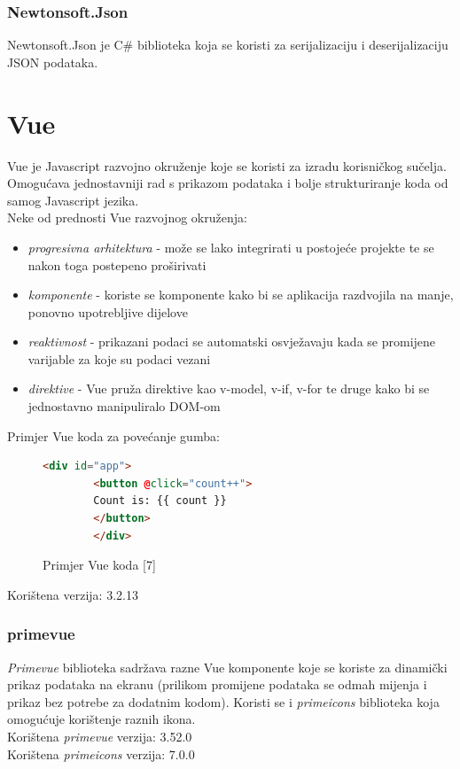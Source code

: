 \documentclass[zavrsnirad]{fer}
\begin{document}
\subsubsection{Newtonsoft.Json}
Newtonsoft.Json je C\# biblioteka koja se koristi za serijalizaciju i deserijalizaciju JSON podataka.

\section{Vue}
\label{pog:vue}
Vue je Javascript razvojno okruženje koje se koristi za izradu korisničkog sučelja. Omogućava jednostavniji rad s prikazom podataka i bolje strukturiranje koda od samog Javascript jezika.
\\Neke od prednosti Vue razvojnog okruženja:
\begin{itemize}
	\item \textit{progresivna arhitektura} - može se lako integrirati u postojeće projekte te se nakon toga postepeno proširivati
	\item \textit{komponente} - koriste se komponente kako bi se aplikacija razdvojila na manje, ponovno upotrebljive dijelove
	\item \textit{reaktivnost} - prikazani podaci se automatski osvježavaju kada se promijene varijable za koje su podaci vezani
	\item \textit{direktive} - Vue pruža direktive kao v-model, v-if, v-for te druge kako bi se jednostavno manipuliralo DOM-om
\end{itemize}

Primjer Vue koda za povećanje gumba:
\begin{figure}[htb]
	\centering
	\begin{lstlisting}[language=html]
		<div id="app">
		<button @click="count++">
		Count is: {{ count }}
		</button>
		</div>
	\end{lstlisting}
	\caption{Primjer Vue koda [7]}
\end{figure}
\FloatBarrier

Korištena verzija: 3.2.13

\subsubsection{primevue}
\textit{Primevue} biblioteka sadržava razne Vue komponente koje se koriste za dinamički prikaz podataka na ekranu (prilikom promijene podataka se odmah mijenja i prikaz bez potrebe za dodatnim kodom). Koristi se i \textit{primeicons} biblioteka koja omogućuje korištenje raznih ikona.
\\Korištena \textit{primevue} verzija: 3.52.0
\\Korištena \textit{primeicons} verzija: 7.0.0
\end{document}
